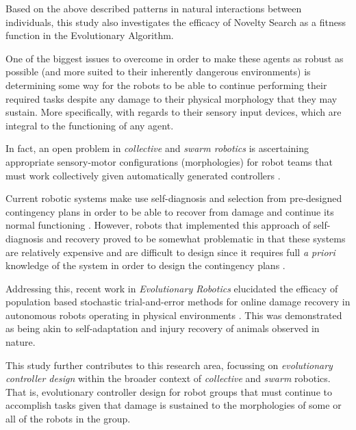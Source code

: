 
Based on the above described patterns in natural interactions between individuals, this study also investigates the efficacy of Novelty Search as a fitness function in the Evolutionary Algorithm.


One of the biggest issues to overcome in order to make these agents as robust as possible (and more suited to their inherently dangerous environments) is determining some way for the robots to be able to continue performing their required tasks despite any damage to their physical morphology that they may sustain. More specifically, with regards to their sensory input devices, which are integral to the functioning of any agent.

In fact, an open problem in \textit{collective} \cite{KubeZhang1994B} and \textit{swarm robotics} \cite{Beni2004}
is ascertaining appropriate sensory-motor configurations (morphologies) for robot teams that must work collectively given automatically generated controllers \cite{FloreanoDurrMattiussi2008}.

Current robotic systems make use self-diagnosis and selection from pre-designed contingency plans in order to be able to recover from damage and continue its normal functioning \cite{fenton2001fault, verma2004real, BongardZykovLipson2006}. However, robots that implemented this approach of self-diagnosis and recovery proved to be somewhat problematic in that these systems are relatively expensive and are difficult to design since it requires full \textit{a priori} knowledge of the system in order to design the contingency plans \cite{CullyCluneTaraporeMouret2015}.





Addressing this, recent work in \textit{Evolutionary Robotics} elucidated the efficacy of population based stochastic trial-and-error methods for online damage recovery in autonomous robots operating in physical environments \cite{CullyCluneTaraporeMouret2015}.
This was demonstrated as being akin to self-adaptation and injury recovery of animals observed in nature.

This study further contributes to this research area, focussing on \textit{evolutionary controller design} \cite{FloreanoDurrMattiussi2008} within the broader context of \textit{collective} \cite{KubeZhang1994B} and \textit{swarm} \cite{Beni2004} robotics.
That is, evolutionary controller design for robot groups that must continue to accomplish tasks given that damage is sustained to the morphologies of some or all of the robots in the group.

